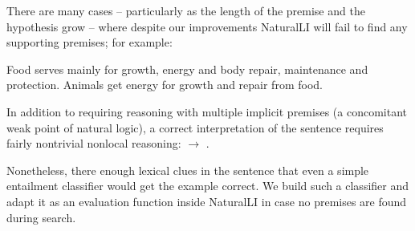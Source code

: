 There are many cases -- particularly as the length of the premise and the hypothesis grow --
  where despite our improvements NaturalLI will fail to find any supporting
  premises; for example:

\entailmentExample
{Food serves mainly for growth, energy and body repair, maintenance and protection.}
{Animals get energy for growth and repair from food.}

In addition to requiring reasoning with multiple implicit premises (a concomitant weak
  point of natural logic), a correct interpretation of the sentence requires
  fairly nontrivial nonlocal reasoning: 
  $\rightarrow$ .

Nonetheless, there enough lexical clues in the sentence that even a simple
  entailment classifier would get the example correct.
We build such a classifier and adapt it as an evaluation function
  inside NaturalLI in case no premises are found during search.



